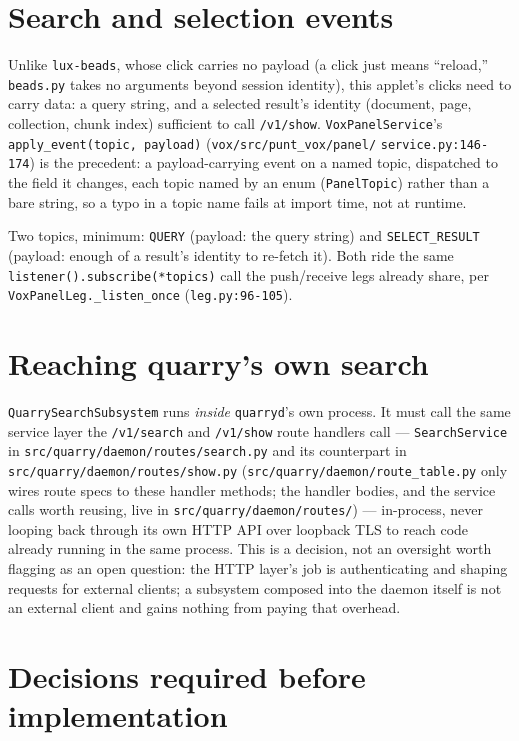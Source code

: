 \documentclass[a4paper,11pt]{report}
\begin{document}
\section{Search and selection events}

Unlike \texttt{lux-beads}, whose click carries no payload (a click just
means ``reload,'' \texttt{beads.py} takes no arguments beyond session
identity), this applet's clicks need to carry data: a query string, and a
selected result's identity (document, page, collection, chunk index)
sufficient to call \texttt{/v1/show}. \texttt{VoxPanelService}'s
\texttt{apply\_event(topic, payload)} (\texttt{vox/src/punt\_vox/panel/}\allowbreak
\texttt{service.py:146-174}) is the precedent: a payload-carrying event on
a named topic, dispatched to the field it changes, each topic named by an
enum (\texttt{PanelTopic}) rather than a bare string, so a typo in a topic
name fails at import time, not at runtime.

Two topics, minimum: \texttt{QUERY} (payload: the query string) and
\texttt{SELECT\_RESULT} (payload: enough of a result's identity to
re-fetch it). Both ride the same \texttt{listener().subscribe(*topics)}
call the push/receive legs already share, per
\texttt{VoxPanelLeg.\_listen\_once} (\texttt{leg.py:96-105}).

\section{Reaching quarry's own search}

\texttt{QuarrySearchSubsystem} runs \emph{inside} \texttt{quarryd}'s own
process. It must call the same service layer the \texttt{/v1/search} and
\texttt{/v1/show} route handlers call --- \texttt{SearchService} in
\texttt{src/quarry/daemon/routes/search.py} and its counterpart in
\texttt{src/quarry/daemon/routes/show.py}
(\texttt{src/quarry/daemon/route\_table.py} only wires route specs
to these handler methods; the handler bodies, and the service calls
worth reusing, live in \texttt{src/quarry/daemon/routes/}) --- in-process,
never looping back through its own HTTP API over loopback TLS to reach
code already running in the same process. This is a decision, not an
oversight worth
flagging as an open question: the HTTP layer's job is authenticating and
shaping requests for external clients; a subsystem composed into the
daemon itself is not an external client and gains nothing from paying
that overhead.

\section{Decisions required before implementation}
\end{document}
